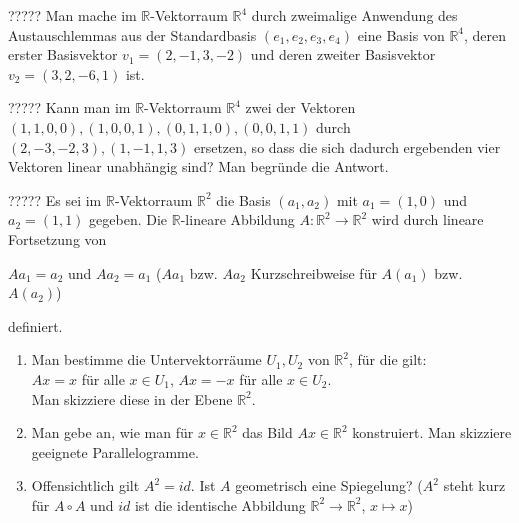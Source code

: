 \documentclass{uebblatt}
\begin{document}

\begin{aufgabe}{?????}
Man mache im $\mathbb{R}$-Vektorraum $\mathbb{R}^4$ durch zweimalige Anwendung des Austauschlemmas aus der Standardbasis $(e_1, e_2, e_3, e_4)$ eine Basis von $\mathbb{R}^4$, deren erster Basisvektor $v_1 = (2, -1, 3, -2)$ und deren zweiter Basisvektor $v_2 = (3, 2, -6, 1)$ ist.
\end{aufgabe}


\begin{aufgabe}{?????}
Kann man im $\mathbb{R}$-Vektorraum $\mathbb{R}^4$ zwei der Vektoren $(1, 1, 0, 0), (1, 0, 0, 1), (0, 1, 1, 0), (0, 0, 1, 1)$ durch $(2, -3, -2, 3), (1, -1, 1, 3)$ ersetzen, so dass die sich dadurch ergebenden vier Vektoren linear unabhängig sind? Man begründe die Antwort.
\end{aufgabe}


\begin{aufgabe}{?????}
Es sei im $\mathbb{R}$-Vektorraum $\mathbb{R}^2$ die Basis $(a_1, a_2)$ mit $a_1 = (1, 0)$ und $a_2 = (1, 1)$ gegeben. Die $\mathbb{R}$-lineare Abbildung $A: \mathbb{R}^2 \to \mathbb{R}^2$ wird durch lineare Fortsetzung von
\begin{center}
$Aa_1 = a_2$ und $Aa_2 = a_1$ ($Aa_1$ bzw. $Aa_2$ Kurzschreibweise für $A(a_1)$ bzw. $A(a_2)$)
\end{center}
definiert.
\begin{enumerate}
\item Man bestimme die Untervektorräume $U_1 , U_2$ von $\mathbb{R}^2$, für die gilt:\\
$Ax = x$ für alle $x \in U_1$, $Ax = -x$ für alle $x \in U_2$.\\
Man skizziere diese in der Ebene $\mathbb{R}^2$.
\item Man gebe an, wie man für $x \in \mathbb{R}^2$ das Bild $Ax \in \mathbb{R}^2$ konstruiert. Man skizziere geeignete Parallelogramme.
\item Offensichtlich gilt $A^2 = id$. Ist $A$ geometrisch eine Spiegelung? ($A^2$ steht kurz für $A \circ A$ und $id$ ist die identische Abbildung $\mathbb{R}^2 \to \mathbb{R}^2$, $x \mapsto x$)
\end{enumerate}
\end{aufgabe}
\end{document}
